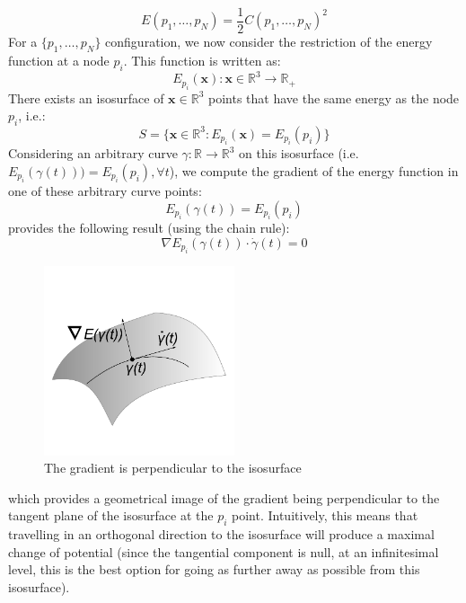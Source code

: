 \documentclass[12pt]{article}
\begin{document}
\begin{equation}
\label{constraint_potential}
E(p_1, \ldots, p_N) = \frac{1}{2} C(p_1, \ldots, p_N)^2
\end{equation}
For a $\{p_1, \ldots, p_N\}$ configuration, we now consider the restriction of the energy function at a node $p_i$. This function is written as:
\begin{equation}
E_{p_i}(\mathbf{x}) : \mathbf{x} \in \mathbb{R}^3 \to \mathbb{R}_{+}
\end{equation} 
There exists an isosurface of $\mathbf{x} \in \mathbb{R}^3$ points that have the same energy as the node $p_i$, i.e.:
$$
S = \{ \mathbf{x} \in \mathbb{R}^3 : E_{p_i}(\mathbf{x}) = E_{p_i}(p_i) \}
$$
Considering an arbitrary curve $\gamma:\mathbb{R} \to \mathbb{R}^3$ on this isosurface (i.e. $E_{p_i}(\gamma(t))) = E_{p_i}(p_i), \forall t$), we
compute the gradient of the energy function in one of these arbitrary curve points:
$$
E_{p_i}(\gamma(t)) = E_{p_i}(p_i) 
$$ 
provides the following result (using the chain rule):
$$ 
\nabla E_{p_i}(\gamma(t)) \cdot \dot{\gamma}(t) = 0
$$

\begin{figure}[h!]
\caption{The gradient is perpendicular to the isosurface}
\centering
\includegraphics[width=0.5\textwidth]{"figs/gradientiso"}
\end{figure}

which provides a geometrical image of the gradient being perpendicular to the tangent plane of the isosurface at the $p_i$ point. Intuitively, this means that travelling in an orthogonal direction to the isosurface will produce a maximal change of potential (since the tangential component is null, at an infinitesimal level, this is the best option for going as further away as possible from this isosurface).
\end{document}

